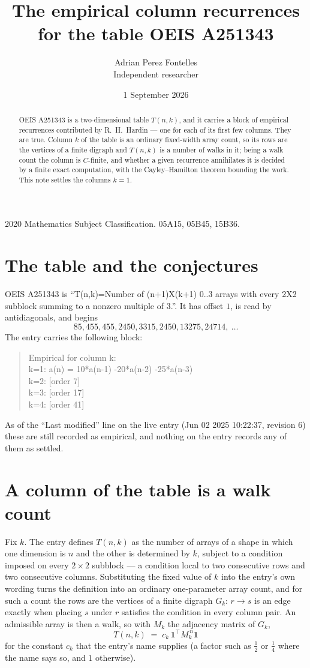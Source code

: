 \documentclass[11pt,a4paper]{article}
\title{The empirical column recurrences for the table OEIS A251343}
\author{Adrian Perez Fontelles\\ \small Independent researcher}
\date{1 September 2026}
\theoremstyle{plain}
\theoremstyle{definition}
\begin{document}
\maketitle

\begin{abstract}
OEIS A251343 is a two-dimensional table $T(n,k)$, and it carries a block of empirical
recurrences contributed by R.~H.~Hardin --- one for each of its first few columns. They are
true. Column $k$ of the table is an ordinary fixed-width array count, so its rows are the
vertices of a finite digraph and $T(n,k)$ is a number of walks in it; being a walk count the
column is $C$-finite, and whether a given recurrence annihilates it is decided by a finite
exact computation, with the Cayley--Hamilton theorem bounding the work. This note settles the columns $k=1$.
\end{abstract}

\noindent\small 2020 Mathematics Subject Classification. 05A15, 05B45, 15B36.\normalsize

\section{The table and the conjectures}

OEIS A251343 is ``T(n,k)=Number of (n+1)X(k+1) 0..3 arrays with every 2X2 subblock summing to a nonzero multiple of 3.''. It has offset $1$, is
read by antidiagonals, and begins
\[
85, 455, 455, 2450, 3315, 2450, 13275, 24714,\ \dots
\]
The entry carries the following block:
\begin{quote}\small
Empirical for column k:\\
k=1: a(n) = 10*a(n-1) -20*a(n-2) -25*a(n-3)\\
k=2: [order 7]\\
k=3: [order 17]\\
k=4: [order 41]\\
\end{quote}
As of the ``Last modified'' line on the live entry (Jun 02 2025 10:22:37, revision 6) these are still
recorded as empirical, and nothing on the entry records any of them as settled.

\section{A column of the table is a walk count}

Fix $k$. The entry defines $T(n,k)$ as the number of arrays of a shape in which one dimension
is $n$ and the other is determined by $k$, subject to a condition imposed on every
$2\times2$ subblock --- a condition local to two consecutive rows and two consecutive columns.
Substituting the fixed value of $k$ into the entry's own wording turns the definition into an
ordinary one-parameter array count, and for such a count the rows are the vertices of a finite
digraph $G_k$: $r\to s$ is an edge exactly when placing $s$ under $r$ satisfies the condition
in every column pair. An admissible array is then a walk, so with $M_k$ the adjacency matrix
of $G_k$,
\[
T(n,k)\;=\;c_k\,\mathbf{1}^{\!\top}M_k^{\,n}\mathbf{1}
\]
for the constant $c_k$ that the entry's name supplies (a factor such as $\tfrac12$ or
$\tfrac14$ where the name says so, and $1$ otherwise).
\end{document}
